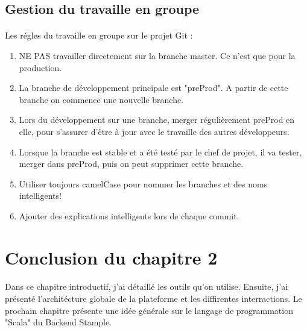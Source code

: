 \subsection{Gestion du travaille en groupe}
\paragraph{}
Les régles du travaille en groupe sur le projet Git :
\begin{enumerate}
\item NE PAS travailler directement sur la branche master. Ce n'est que pour la production.
\item La branche de développement principale est "preProd". A partir de cette branche on commence une nouvelle branche. 
\item Lors du développement sur une branche, merger régulièrement preProd en elle, pour s'assurer d'être à jour avec le travaille des autres développeurs.
\item Lorsque la branche est stable et a été testé par le chef de projet, il va tester, merger dans preProd, puis on peut supprimer cette branche.
\item Utiliser toujours camelCase pour nommer les branches et des noms intelligents!
\item Ajouter des explications intelligents lors de chaque commit.
\end{enumerate}
\section{Conclusion du chapitre 2}
\paragraph{}
Dans ce chapitre introductif, j'ai détaillé les outils qu'on utilise. Ensuite, j'ai présenté l'architécture globale de la plateforme et les diffirentes interractions. Le prochain chapitre présente une idée générale sur le langage de programmation "Scala" du Backend Stample. 
